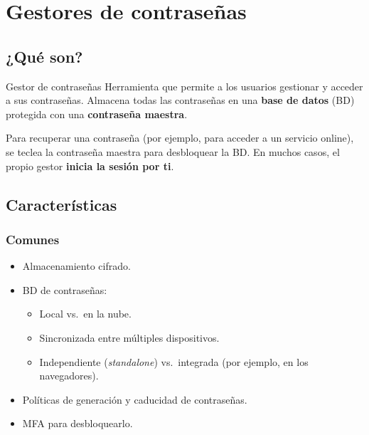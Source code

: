 \documentclass[11pt,a4paper]{report}
\begin{document}
\chapter{Gestores de contraseñas}
 
\section{¿Qué son?}
 
\begin{definicion}{Gestor de contraseñas}
Herramienta que permite a los usuarios gestionar y acceder a sus contraseñas. Almacena todas las contraseñas en una \textbf{base de datos} (BD) protegida con una \textbf{contraseña maestra}.
\end{definicion}
 
Para recuperar una contraseña (por ejemplo, para acceder a un servicio online), se teclea la contraseña maestra para desbloquear la BD. En muchos casos, el propio gestor \textbf{inicia la sesión por ti}.
 
\section{Características}
 
\subsection{Comunes}
\begin{itemize}
  \item Almacenamiento cifrado.
  \item BD de contraseñas:
    \begin{itemize}
      \item Local vs.\ en la nube.
      \item Sincronizada entre múltiples dispositivos.
      \item Independiente (\emph{standalone}) vs.\ integrada (por ejemplo, en los navegadores).
    \end{itemize}
  \item Políticas de generación y caducidad de contraseñas.
  \item MFA para desbloquearlo.
\end{itemize}
 
\end{document}
